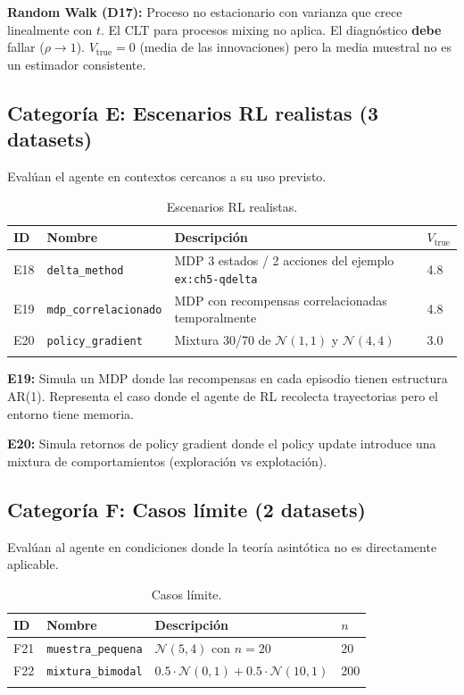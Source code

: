 \documentclass[12pt,a4paper]{article}
\begin{document}
\textbf{Random Walk (D17):} Proceso no estacionario con varianza que crece linealmente con $t$. El CLT para procesos mixing no aplica. El diagnóstico \textbf{debe} fallar ($\rho \to 1$). $V_{\text{true}} = 0$ (media de las innovaciones) pero la media muestral no es un estimador consistente.

\subsection{Categoría E: Escenarios RL realistas (3 datasets)}

Evalúan el agente en contextos cercanos a su uso previsto.

\begin{longtable}{@{}llll@{}}
    \toprule
    ID & Nombre & Descripción & $V_{\text{true}}$ \\
    \midrule
    \endhead
    E18 & \texttt{delta\_method} & MDP 3 estados / 2 acciones del ejemplo \texttt{ex:ch5-qdelta} & 4.8 \\
    E19 & \texttt{mdp\_correlacionado} & MDP con recompensas correlacionadas temporalmente & 4.8 \\
    E20 & \texttt{policy\_gradient} & Mixtura 30/70 de $\mathcal{N}(1,1)$ y $\mathcal{N}(4,4)$ & 3.0 \\
    \bottomrule
    \caption{Escenarios RL realistas.}
\end{longtable}

\textbf{E19:} Simula un MDP donde las recompensas en cada episodio tienen estructura AR(1). Representa el caso donde el agente de RL recolecta trayectorias pero el entorno tiene memoria.

\textbf{E20:} Simula retornos de policy gradient donde el policy update introduce una mixtura de comportamientos (exploración vs explotación).

\subsection{Categoría F: Casos límite (2 datasets)}

Evalúan al agente en condiciones donde la teoría asintótica no es directamente aplicable.

\begin{longtable}{@{}llll@{}}
    \toprule
    ID & Nombre & Descripción & $n$ \\
    \midrule
    \endhead
    F21 & \texttt{muestra\_pequena} & $\mathcal{N}(5,4)$ con $n=20$ & 20 \\
    F22 & \texttt{mixtura\_bimodal} & $0.5 \cdot \mathcal{N}(0,1) + 0.5 \cdot \mathcal{N}(10,1)$ & 200 \\
    \bottomrule
    \caption{Casos límite.}
\end{longtable}
\end{document}
